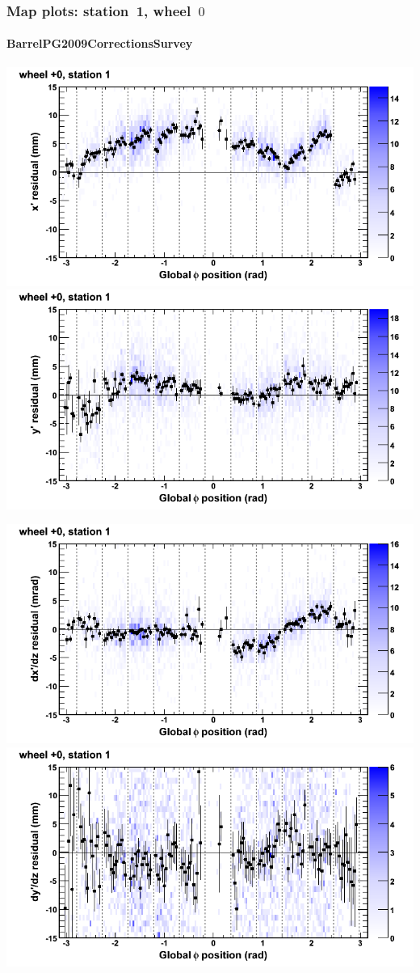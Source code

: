\documentclass[compress]{beamer}
\begin{document}
\begin{frame}
\frametitle{Map plots: station~1, wheel~$0$}
\framesubtitle{BarrelPG2009CorrectionsSurvey}
\includegraphics[width=0.5\linewidth]{mapplots_01/DTvsphi_st1whC_x.png}
\includegraphics[width=0.5\linewidth]{mapplots_01/DTvsphi_st1whC_y.png}

\includegraphics[width=0.5\linewidth]{mapplots_01/DTvsphi_st1whC_dxdz.png}
\includegraphics[width=0.5\linewidth]{mapplots_01/DTvsphi_st1whC_dydz.png}
\end{frame}
\end{document}
